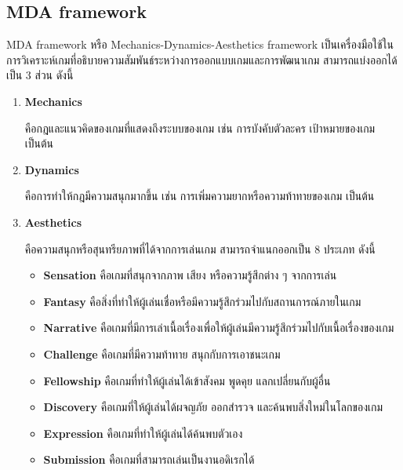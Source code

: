 \documentclass[12pt,oneside,openright,a4paper]{cpe-thai-project}
\begin{document}
\subsection{MDA framework\cite{mda04}}
MDA framework หรือ Mechanics-Dynamics-Aesthetics framework 
เป็นเครื่องมือใช้ในการวิเคราะห์เกมที่อธิบายความสัมพันธ์ระหว่างการออกแบบเกมและการพัฒนาเกม 
สามารถแบ่งออกได้เป็น 3 ส่วน ดังนี้ 
\begin{enumerate}
  \item \textbf{Mechanics}
  
    คือกฎและแนวคิดของเกมที่แสดงถึงระบบของเกม เช่น การบังคับตัวละคร เป้าหมายของเกม เป็นต้น

  \item \textbf{Dynamics}
  
    คือการทำให้กฎมีความสนุกมากขึ้น เช่น การเพิ่มความยากหรือความท้าทายของเกม เป็นต้น

  \item \textbf{Aesthetics}
  
    คือความสนุกหรือสุนทรียภาพที่ได้จากการเล่นเกม สามารถจำแนกออกเป็น 8 ประเภท ดังนี้

  \begin{itemize}
    \item \textbf{Sensation} คือเกมที่สนุกจากภาพ เสียง หรือความรู้สึกต่าง ๆ จากการเล่น
    \item \textbf{Fantasy} คือสิ่งที่ทำให้ผู้เล่นเชื่อหรือมีความรู้สึกร่วมไปกับสถานการณ์ภายในเกม
    \item \textbf{Narrative} คือเกมที่มีการเล่าเนื้อเรื่องเพื่อให้ผู้เล่นมีความรู้สึกร่วมไปกับเนื้อเรื่องของเกม
    \item \textbf{Challenge} คือเกมที่มีความท้าทาย สนุกกับการเอาชนะเกม
    \item \textbf{Fellowship} คือเกมที่ทำให้ผู้เล่นได้เข้าสังคม พูดคุย แลกเปลี่ยนกับผู้อื่น
    \item \textbf{Discovery} คือเกมที่ให้ผู้เล่นได้ผจญภัย ออกสำรวจ และค้นพบสิ่งใหม่ในโลกของเกม
    \item \textbf{Expression} คือเกมที่ทำให้ผู้เล่นได้ค้นพบตัวเอง
    \item \textbf{Submission} คือเกมที่สามารถเล่นเป็นงานอดิเรกได้
  \end{itemize}
\end{enumerate}
\end{document}
